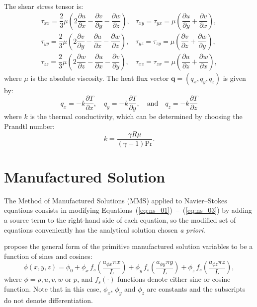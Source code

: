 \documentclass[10pt]{article}
\newcommand{\diff}[2] {\dfrac{\partial #1}{\partial #2}}
\begin{document}
The shear stress tensor is:
\begin{equation}
 \begin{array}{lll}
  \tau_{xx}= \dfrac{2}{3}  \mu \left( 2 \diff{u}{x} - \diff{v}{y} -\diff{w}{z} \right),
  &\tau_{xy}= \tau_{yx}=\mu \left( \diff{u}{y} + \diff{v}{x}\right),\\
  \tau_{yy}= \dfrac{2}{3}  \mu \left( 2 \diff{v}{y} - \diff{u}{x} -\diff{w}{z} \right),
  &\tau_{yz}= \tau_{zy}=\mu \left( \diff{v}{z} + \diff{w}{y}\right),\\
  \tau_{zz}= \dfrac{2}{3}  \mu \left( 2 \diff{w}{z} - \diff{u}{x} -\diff{v}{y} \right),
  &\tau_{xz}= \tau_{zx}=\mu \left( \diff{u}{z} + \diff{w}{x}\right),
 \end{array}
\end{equation}
where $\mu$ is the absolute viscosity. The heat flux vector $\mathbf{q}=(q_x,q_y,q_z)$ is given by:
\begin{equation}
 q_x = - k \diff{T}{x}, \quad q_y = - k \diff{T}{y}, \quad \mbox{and} \quad q_z = - k \diff{T}{z}
 \end{equation}
where $k$ is the thermal conductivity, which can be determined by choosing the Prandtl number:
$$k= \dfrac{\gamma R \mu}{ (\gamma-1) \text{Pr}}.$$

\section{Manufactured Solution}

The Method of Manufactured Solutions (MMS) applied to Navier--Stokes equations consists in modifying Equations~(\ref{eq:ns_01})~--~(\ref{eq:ns_03}) by adding a source term to the right-hand side of each equation, so the modified set of equations conveniently has the analytical solution chosen \textit{a priori}.

\citet{Roy2002} propose the general form of the primitive manufactured solution variables to be  a function of sines and cosines:
\begin{equation}
 \label{eq:manufactured01}
  \phi (x,y,z) = \phi_0+ \phi_x\, f_s \left(\frac{a_{\phi x} \pi x}{L} \right) +  \phi_y \,f_s\left(\frac{a_{\phi y} \pi y}{L}\right) + \phi_z \,f_s\left(\frac{a_{\phi z} \pi z}{L}\right),
\end{equation}
where $\phi=\rho,u,v,w$ or $p$, and $f_s(\cdot)$ functions denote either sine or cosine function. Note that in this case, $\phi_x$, $\phi_y$  and $\phi_z$ are constants  and the subscripts do not denote differentiation.
\end{document}
